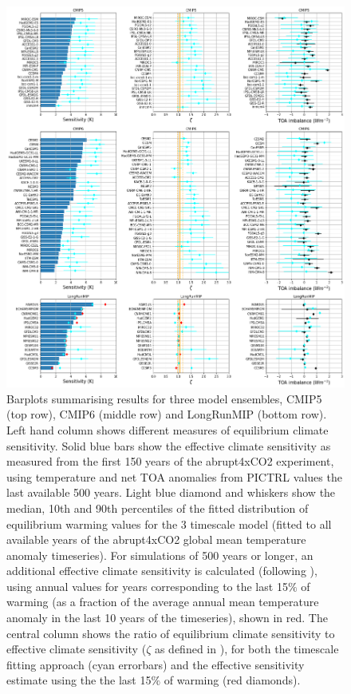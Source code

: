 \documentclass[esd, article]{copernicus}
\begin{document}
\begin{figure}
    \centering
    \includegraphics[width=\linewidth]{histo.png}
    \caption{Barplots summarising results for three model ensembles, CMIP5 (top row), CMIP6 (middle row) and LongRunMIP (bottom row).  Left hand column shows different measures of equilibrium climate sensitivity.  Solid blue bars show the effective climate sensitivity as measured from the first 150 years of the abrupt4xCO2 experiment, using temperature and net TOA anomalies from PICTRL values the last available 500 years.  Light blue diamond and whiskers show the median, 10th and 90th percentiles of the fitted distribution of equilibrium warming values for the 3 timescale model (fitted to all available years of the abrupt4xCO2 global mean temperature anomaly timeseries).  For simulations of 500 years or longer, an additional effective climate sensitivity is calculated (following \cite{rugenstein2020equilibrium}), using annual values for years corresponding to the last 15$\%$ of warming (as a fraction of the average annual mean temperature anomaly in the last 10 years of the timeseries), shown in red.  The central column shows the ratio of equilibrium climate sensitivity to effective climate sensitivity ($\zeta$ as defined in \cite{sherwood2020assessment}), for both the timescale fitting approach (cyan errorbars) and the effective sensitivity estimate using the the last 15$\%$ of warming (red diamonds). }
    \label{fig:histo}
\end{figure}
\end{document}
